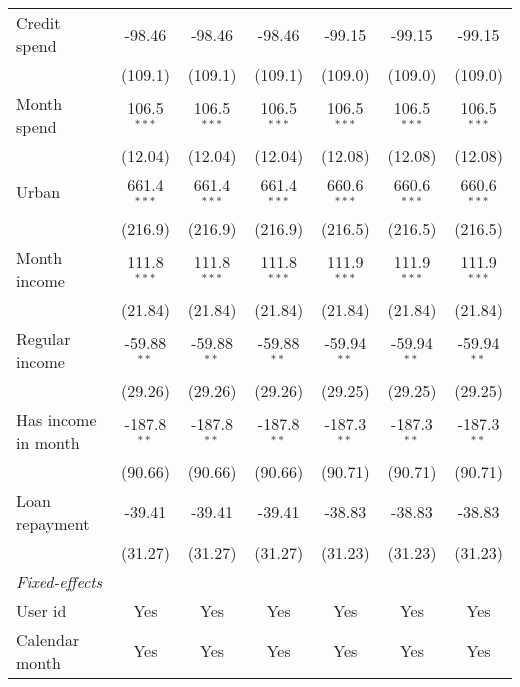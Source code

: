 \begin{table}[htbp]
\begin{threeparttable}[b]
\begin{tabular}{lcccccc}
         Credit spend        & -98.46        & -98.46        & -98.46        & -99.15        & -99.15        & -99.15\\   
                             & (109.1)       & (109.1)       & (109.1)       & (109.0)       & (109.0)       & (109.0)\\   
         Month spend         & 106.5$^{***}$ & 106.5$^{***}$ & 106.5$^{***}$ & 106.5$^{***}$ & 106.5$^{***}$ & 106.5$^{***}$\\   
                             & (12.04)       & (12.04)       & (12.04)       & (12.08)       & (12.08)       & (12.08)\\   
         Urban               & 661.4$^{***}$ & 661.4$^{***}$ & 661.4$^{***}$ & 660.6$^{***}$ & 660.6$^{***}$ & 660.6$^{***}$\\   
                             & (216.9)       & (216.9)       & (216.9)       & (216.5)       & (216.5)       & (216.5)\\   
         Month income        & 111.8$^{***}$ & 111.8$^{***}$ & 111.8$^{***}$ & 111.9$^{***}$ & 111.9$^{***}$ & 111.9$^{***}$\\   
                             & (21.84)       & (21.84)       & (21.84)       & (21.84)       & (21.84)       & (21.84)\\   
         Regular income      & -59.88$^{**}$ & -59.88$^{**}$ & -59.88$^{**}$ & -59.94$^{**}$ & -59.94$^{**}$ & -59.94$^{**}$\\   
                             & (29.26)       & (29.26)       & (29.26)       & (29.25)       & (29.25)       & (29.25)\\   
         Has income in month & -187.8$^{**}$ & -187.8$^{**}$ & -187.8$^{**}$ & -187.3$^{**}$ & -187.3$^{**}$ & -187.3$^{**}$\\   
                             & (90.66)       & (90.66)       & (90.66)       & (90.71)       & (90.71)       & (90.71)\\   
         Loan repayment      & -39.41        & -39.41        & -39.41        & -38.83        & -38.83        & -38.83\\   
                             & (31.27)       & (31.27)       & (31.27)       & (31.23)       & (31.23)       & (31.23)\\   
         \midrule
         \emph{Fixed-effects}\\
         User id             & Yes           & Yes           & Yes           & Yes           & Yes           & Yes\\  
         Calendar month      & Yes           & Yes           & Yes           & Yes           & Yes           & Yes\\  

\end{tabular}
\end{threeparttable}
\end{table}

